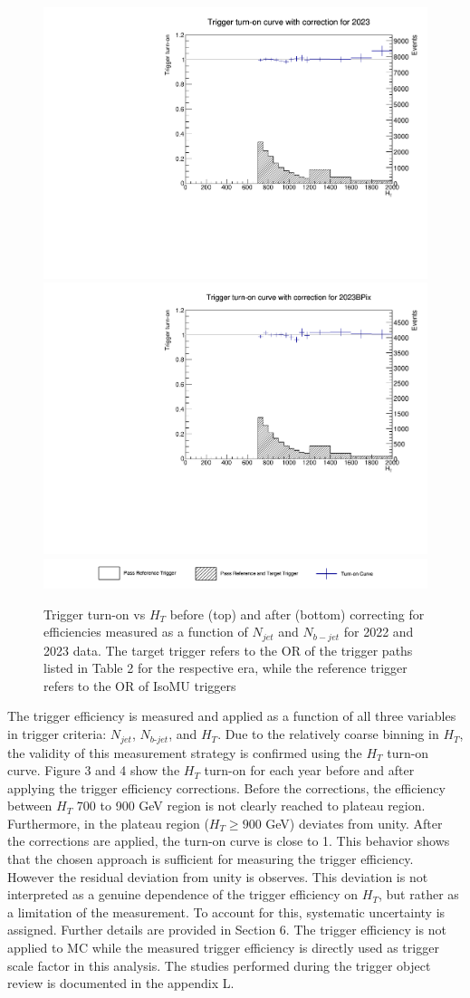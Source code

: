 \documentclass[twoside]{article}
\begin{document}
\begin{figure}[!t]
    \includegraphics[width=.24\columnwidth]{plots/Trigger/turnOn_2023_Coron.pdf}
    \includegraphics[width=.24\columnwidth]{plots/Trigger/turnOn_2023BPix_Coron.pdf}
    \includegraphics[width=.88\columnwidth]{plots/Trigger/Legend.png}

    \caption{Trigger turn-on vs $H_T$ before (top) and after (bottom) correcting for efficiencies measured as a function of $N_{jet}$ and $N_{b-jet}$ for 2022 and 2023 data. The target trigger refers to the OR of the trigger paths listed in Table 2 for the respective era, while the reference trigger refers to the OR of IsoMU triggers}
\end{figure}

The trigger efficiency is measured and applied as a function of all three variables in trigger criteria: $N_{jet}$, $N_{b\text{-}jet}$, and $H_T$. Due to the relatively coarse binning in $H_T$, the validity of this measurement strategy is confirmed using the $H_T$ turn-on curve. Figure 3 and 4 show the $H_T$ turn-on for each year before and after applying the trigger efficiency corrections. Before the corrections, the efficiency between $H_T$ 700 to 900 GeV region is not clearly reached to plateau region. Furthermore, in the plateau region ($H_T \geq 900$ GeV) deviates from unity. After the corrections are applied, the turn-on curve is close to 1. This behavior shows that the chosen approach is sufficient for measuring the trigger efficiency. However the residual deviation from unity is observes. This deviation is not interpreted as a genuine dependence of the trigger efficiency on $H_T$, but rather as a limitation of the measurement. To account for this, systematic uncertainty is assigned. Further details are provided in Section 6.
 The trigger efficiency is not applied to MC while the measured trigger efficiency is directly used as trigger scale factor in this analysis. The studies performed during the trigger object review is documented in the appendix L. \\
\end{document}
